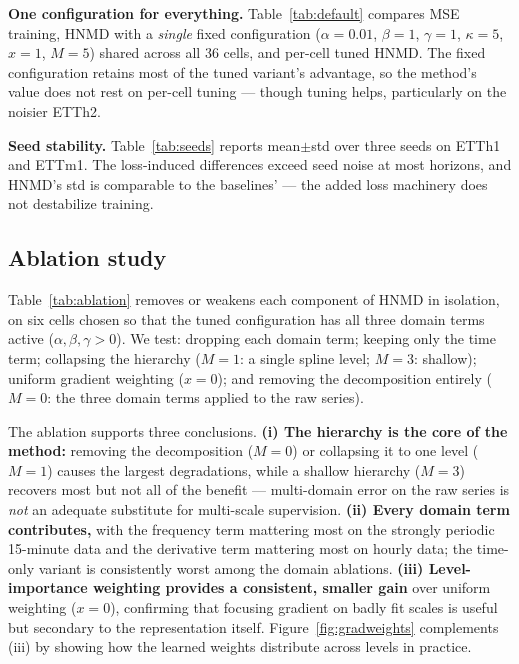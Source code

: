 \documentclass[11pt,twocolumn]{article}
\newcommand{\methodName}{HNMD\xspace}
\begin{document}
\textbf{One configuration for everything.} Table~\ref{tab:default} compares MSE training, \methodName with a \emph{single} fixed configuration ($\alpha{=}0.01$, $\beta{=}1$, $\gamma{=}1$, $\kappa{=}5$, $x{=}1$, $M{=}5$) shared across all 36 cells, and per-cell tuned \methodName. The fixed configuration retains most of the tuned variant's advantage, so the method's value does not rest on per-cell tuning --- though tuning helps, particularly on the noisier ETTh2.


\textbf{Seed stability.} Table~\ref{tab:seeds} reports mean$\pm$std over three seeds on ETTh1 and ETTm1. The loss-induced differences exceed seed noise at most horizons, and \methodName's std is comparable to the baselines' --- the added loss machinery does not destabilize training.


\subsection{Ablation study}
\label{sec:ablation}

Table~\ref{tab:ablation} removes or weakens each component of \methodName in isolation, on six cells chosen so that the tuned configuration has all three domain terms active ($\alpha, \beta, \gamma > 0$). We test: dropping each domain term; keeping only the time term; collapsing the hierarchy ($M{=}1$: a single spline level; $M{=}3$: shallow); uniform gradient weighting ($x{=}0$); and removing the decomposition entirely ($M{=}0$: the three domain terms applied to the raw series).



The ablation supports three conclusions. \textbf{(i) The hierarchy is the core of the method:} removing the decomposition ($M{=}0$) or collapsing it to one level ($M{=}1$) causes the largest degradations, while a shallow hierarchy ($M{=}3$) recovers most but not all of the benefit --- multi-domain error on the raw series is \emph{not} an adequate substitute for multi-scale supervision. \textbf{(ii) Every domain term contributes,} with the frequency term mattering most on the strongly periodic 15-minute data and the derivative term mattering most on hourly data; the time-only variant is consistently worst among the domain ablations. \textbf{(iii) Level-importance weighting provides a consistent, smaller gain} over uniform weighting ($x{=}0$), confirming that focusing gradient on badly fit scales is useful but secondary to the representation itself. Figure~\ref{fig:gradweights} complements (iii) by showing how the learned weights distribute across levels in practice.
\end{document}
